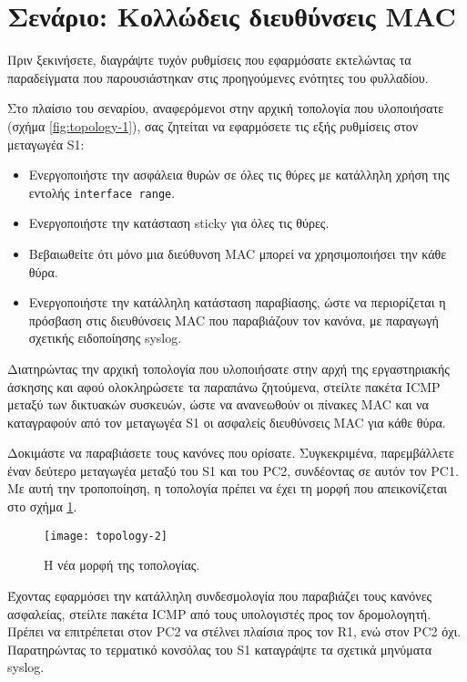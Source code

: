 \documentclass{EdipyLabs} %
\begin{document}
\section{Σενάριο: Κολλώδεις διευθύνσεις MAC}
Πριν ξεκινήσετε, διαγράψτε τυχόν ρυθμίσεις που εφαρμόσατε εκτελώντας τα παραδείγματα που παρουσιάστηκαν στις προηγούμενες ενότητες του φυλλαδίου.

Στο πλαίσιο του σεναρίου, αναφερόμενοι στην αρχική τοπολογία που υλοποιήσατε (σχήμα \ref{fig:topology-1}), σας ζητείται να εφαρμόσετε τις εξής ρυθμίσεις στον μεταγωγέα S1:
\begin{itemize}
	\item Ενεργοποιήστε την ασφάλεια θυρών σε όλες τις θύρες με κατάλληλη χρήση της εντολής \texttt{interface range}.
	\item Ενεργοποιήστε την κατάσταση sticky για όλες τις θύρες.
	\item Βεβαιωθείτε ότι μόνο μια διεύθυνση MAC μπορεί να χρησιμοποιήσει την κάθε θύρα.
	\item Ενεργοποιήστε την κατάλληλη κατάσταση παραβίασης, ώστε να περιορίζεται η πρόσβαση στις διευθύνσεις MAC που παραβιάζουν τον κανόνα, με παραγωγή σχετικής ειδοποίησης syslog.
\end{itemize}

Διατηρώντας την αρχική τοπολογία που υλοποιήσατε στην αρχή της εργαστηριακής άσκησης και αφού ολοκληρώσετε τα παραπάνω ζητούμενα, στείλτε πακέτα ICMP μεταξύ των δικτυακών συσκευών, ώστε να ανανεωθούν οι πίνακες MAC και να καταγραφούν από τον μεταγωγέα S1 οι ασφαλείς διευθύνσεις MAC για κάθε θύρα.

Δοκιμάστε να παραβιάσετε τους κανόνες που ορίσατε. Συγκεκριμένα, παρεμβάλλετε έναν δεύτερο μεταγωγέα μεταξύ του S1 και του PC2, συνδέοντας σε αυτόν τον PC1. Με αυτή την τροποποίηση, η τοπολογία πρέπει να έχει τη μορφή που απεικονίζεται στο σχήμα \ref{fig:topology-2}.

\begin{figure}[ht]
	\centering
	\texttt{[image: topology-2]}
	\caption{Η νέα μορφή της τοπολογίας.}\label{fig:topology-2}
\end{figure}

Έχοντας εφαρμόσει την κατάλληλη συνδεσμολογία που παραβιάζει τους κανόνες ασφαλείας, στείλτε πακέτα ICMP από τους υπολογιστές προς τον δρομολογητή. Πρέπει να επιτρέπεται στον PC2 να στέλνει πλαίσια προς τον R1, ενώ στον PC2 όχι. Παρατηρώντας το τερματικό κονσόλας του S1 καταγράψτε τα σχετικά μηνύματα syslog. 
\end{document}
